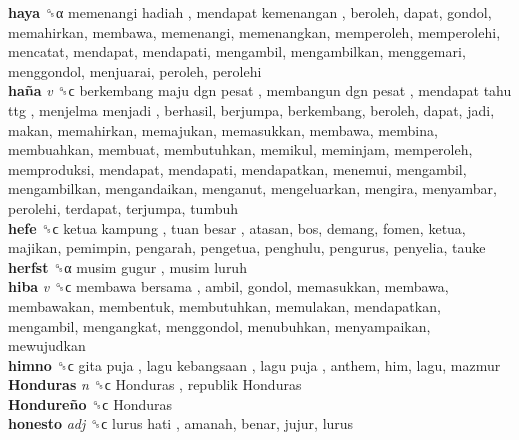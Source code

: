 \textbf{haya} ␝α   memenangi hadiah ,  mendapat kemenangan , beroleh, dapat, gondol, memahirkan, membawa, memenangi, memenangkan, memperoleh, memperolehi, mencatat, mendapat, mendapati, mengambil, mengambilkan, menggemari, menggondol, menjuarai, peroleh, perolehi  \\
\textbf{haña} \emph{v}  ␝ϲ   berkembang maju dgn pesat ,  membangun dgn pesat ,  mendapat tahu ttg ,  menjelma menjadi , berhasil, berjumpa, berkembang, beroleh, dapat, jadi, makan, memahirkan, memajukan, memasukkan, membawa, membina, membuahkan, membuat, membutuhkan, memikul, meminjam, memperoleh, memproduksi, mendapat, mendapati, mendapatkan, menemui, mengambil, mengambilkan, mengandaikan, menganut, mengeluarkan, mengira, menyambar, perolehi, terdapat, terjumpa, tumbuh  \\
\textbf{hefe} ␝ϲ   ketua kampung ,  tuan besar , atasan, bos, demang, fomen, ketua, majikan, pemimpin, pengarah, pengetua, penghulu, pengurus, penyelia, tauke  \\
\textbf{herfst} ␝α   musim gugur ,  musim luruh   \\
\textbf{hiba} \emph{v}  ␝ϲ   membawa bersama , ambil, gondol, memasukkan, membawa, membawakan, membentuk, membutuhkan, memulakan, mendapatkan, mengambil, mengangkat, menggondol, menubuhkan, menyampaikan, mewujudkan  \\
\textbf{himno} ␝ϲ   gita puja ,  lagu kebangsaan ,  lagu puja , anthem, him, lagu, mazmur  \\
\textbf{Honduras} \emph{n}  ␝ϲ   Honduras ,  republik Honduras   \\
\textbf{Hondureño} ␝ϲ   Honduras   \\
\textbf{honesto} \emph{adj}  ␝ϲ   lurus hati , amanah, benar, jujur, lurus  \\
